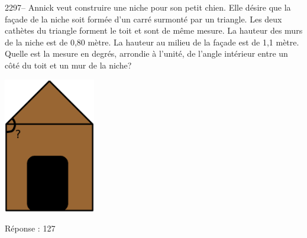 \documentclass[letterpaper, 12pt]{article}
\begin{document}
2297-- Annick veut construire une niche pour son petit chien. Elle d\'esire que la fa\c cade de la niche soit form\'ee d'un carr\'e surmont\'e par un triangle. Les deux cath\`etes du triangle forment le toit et sont de m\^eme mesure. La hauteur des murs de la niche est de 0,80 m\`etre. La hauteur au milieu de la fa\c cade est de 1,1 m\`etre. Quelle est la mesure en degr\'es, arrondie \`a l'unit\'e, de l'angle int\'erieur entre un c\^ot\'e du toit et un mur de la niche?
\begin{center}
 \includegraphics[width=4cm,bb=14 14 627 807]{Niche2296.eps}
\end{center}

R\'eponse : 127\\
\end{document}
